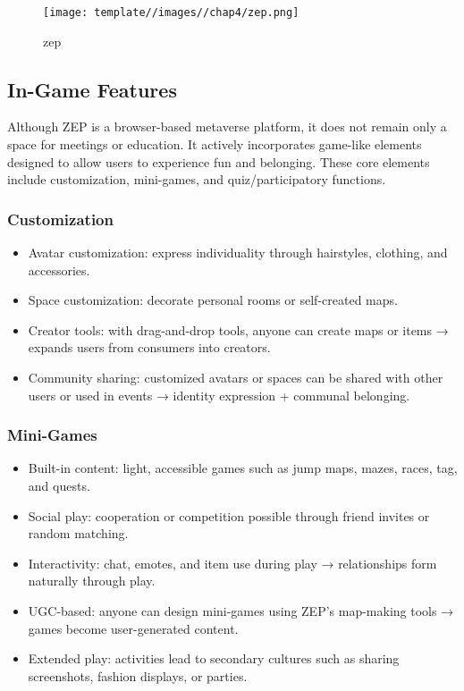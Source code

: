 \begin{figure}
    \centering
    \texttt{[image: template//images//chap4/zep.png]}
    \caption{zep}
    \label{fig:placeholder}
\end{figure}

\subsection{In-Game Features}
Although ZEP is a browser-based metaverse platform, it does not remain only a space for meetings or education. It actively incorporates game-like elements designed to allow users to experience fun and belonging. These core elements include customization, mini-games, and quiz/participatory functions.  

\subsubsection{Customization}
\begin{itemize}
    \item Avatar customization: express individuality through hairstyles, clothing, and accessories.  
    \item Space customization: decorate personal rooms or self-created maps.  
    \item Creator tools: with drag-and-drop tools, anyone can create maps or items → expands users from consumers into creators.  
    \item Community sharing: customized avatars or spaces can be shared with other users or used in events → identity expression + communal belonging.  
\end{itemize}

\subsubsection{Mini-Games}
\begin{itemize}
    \item Built-in content: light, accessible games such as jump maps, mazes, races, tag, and quests.  
    \item Social play: cooperation or competition possible through friend invites or random matching.  
    \item Interactivity: chat, emotes, and item use during play → relationships form naturally through play.  
    \item UGC-based: anyone can design mini-games using ZEP’s map-making tools → games become user-generated content.  
    \item Extended play: activities lead to secondary cultures such as sharing screenshots, fashion displays, or parties.  
\end{itemize}

